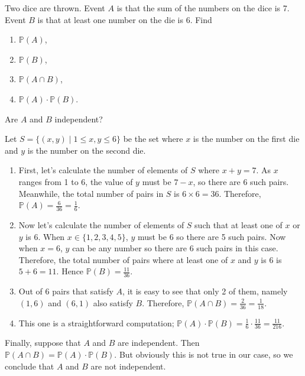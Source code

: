 \begin{question}
    Two dice are thrown. Event $A$ is that the sum of the numbers on the dice
    is 7. Event $B$ is that at least one number on the die is 6. Find 
    \begin{enumerate}
        \item $\mathbb{P}(A)$, 
        
        \item $\mathbb{P}(B)$,
        
        \item $\mathbb{P}(A \cap B)$, 
        
        \item $\mathbb{P}(A) \cdot \mathbb{P}(B)$.
    \end{enumerate}
    Are $A$ and $B$ independent? 
\end{question}
\begin{solution}
    Let $S = \{ (x, y) \mid 1 \leq x, y \leq 6 \}$ be the set where $x$ is the
    number on the first die and $y$ is the number on the second die. 
    \begin{enumerate}
        \item First, let's calculate the number of elements of $S$ where $x + y
            = 7$. As $x$ ranges from 1 to 6, the value of $y$ must be $7 - x$,
            so there are 6 such pairs. Meanwhile, the total number of pairs in
            $S$ is $6 \times 6 = 36$. Therefore, $\mathbb{P}(A) = \frac{6}{36}
            = \frac{1}{6}$.

        \item Now let's calculate the number of elements of $S$ such that at
            least one of $x$ or $y$ is 6. When $x \in \{1, 2, 3, 4, 5\}$, $y$
            must be 6 so there are 5 such pairs. Now when $x = 6$, $y$ can be
            any number so there are 6 such pairs in this case. Therefore, the
            total number of pairs where at least one of $x$ and $y$ is 6 is $5
            + 6 = 11$. Hence $\mathbb{P}(B) = \frac{11}{36}$. 

        \item Out of 6 pairs that satisfy $A$, it is easy to see that only 2 of
            them, namely $(1, 6)$ and $(6, 1)$ also satisfy $B$. Therefore,
            $\mathbb{P}(A \cap B) = \frac{2}{36} = \frac{1}{18}$.

        \item This one is a straightforward computation; $\mathbb{P}(A) \cdot
            \mathbb{P}(B) = \frac{1}{6} \cdot \frac{11}{36} = \frac{11}{216}$. 
    \end{enumerate}

    Finally, suppose that $A$ and $B$ are independent. Then $\mathbb{P}(A \cap
    B) = \mathbb{P}(A) \cdot \mathbb{P}(B)$. But obviously this is not true in
    our case, so we conclude that $A$ and $B$ are not independent. 
\end{solution}

